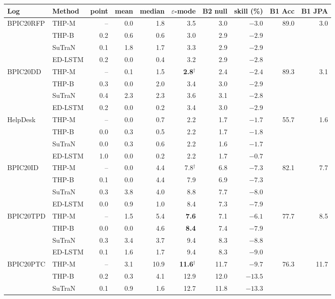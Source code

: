 \begin{tabular}{llrrrrrrrr}
\toprule
Log & Method & point & mean & median & $\varepsilon$-mode & B2 null & skill (\%) & B1 Acc & B1 JPA \\
\midrule
BPIC20RFP & THP-M & -- & 0.0 & 1.8 & 3.5 & 3.0 & $-3.0$ & 89.0 & 3.0 \\
 & THP-B & 0.2 & 0.6 & 0.6 & 3.0 & 2.9 & $-2.9$ &  &  \\
 & SuTraN & 0.1 & 1.8 & 1.7 & 3.3 & 2.9 & $-2.9$ &  &  \\
 & ED-LSTM & 0.2 & 0.0 & 0.4 & 3.2 & 2.9 & $-2.8$ &  &  \\
BPIC20DD & THP-M & -- & 0.1 & 1.5 & \textbf{2.8$^\dagger$} & 2.4 & $-2.4$ & 89.3 & 3.1 \\
 & THP-B & 0.3 & 0.0 & 2.0 & 3.4 & 3.0 & $-2.9$ &  &  \\
 & SuTraN & 0.4 & 2.3 & 2.3 & 3.6 & 3.1 & $-2.8$ &  &  \\
 & ED-LSTM & 0.2 & 0.0 & 0.2 & 3.4 & 3.0 & $-2.9$ &  &  \\
HelpDesk & THP-M & -- & 0.0 & 0.7 & 2.2 & 1.7 & $-1.7$ & 55.7 & 1.6 \\
 & THP-B & 0.0 & 0.3 & 0.5 & 2.2 & 1.7 & $-1.8$ &  &  \\
 & SuTraN & 0.0 & 0.3 & 0.6 & 2.2 & 1.6 & $-1.7$ &  &  \\
 & ED-LSTM & 1.0 & 0.0 & 0.2 & 2.2 & 1.7 & $-0.7$ &  &  \\
BPIC20ID & THP-M & -- & 0.0 & 4.4 & 7.8$^\dagger$ & 6.8 & $-7.3$ & 82.1 & 7.7 \\
 & THP-B & 0.1 & 0.0 & 4.4 & 7.9 & 6.9 & $-7.3$ &  &  \\
 & SuTraN & 0.3 & 3.8 & 4.0 & 8.8 & 7.7 & $-8.0$ &  &  \\
 & ED-LSTM & 0.0 & 0.9 & 1.0 & 8.4 & 7.3 & $-7.9$ &  &  \\
BPIC20TPD & THP-M & -- & 1.5 & 5.4 & \textbf{7.6} & 7.1 & $-6.1$ & 77.7 & 8.5 \\
 & THP-B & 0.0 & 0.0 & 4.6 & \textbf{8.4} & 7.4 & $-7.9$ &  &  \\
 & SuTraN & 0.3 & 3.4 & 3.7 & 9.4 & 8.3 & $-8.8$ &  &  \\
 & ED-LSTM & 0.1 & 1.6 & 1.7 & 9.4 & 8.3 & $-9.0$ &  &  \\
BPIC20PTC & THP-M & -- & 3.1 & 10.9 & \textbf{11.6$^\dagger$} & 11.7 & $-9.7$ & 76.3 & 11.7 \\
 & THP-B & 0.2 & 0.3 & 4.1 & 12.9 & 12.0 & $-13.5$ &  &  \\
 & SuTraN & 0.1 & 0.9 & 1.6 & 12.7 & 11.8 & $-13.3$ &  &  \\

\end{tabular}
